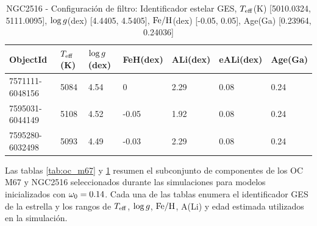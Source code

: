 \begin{table}
	\centering
	\begin{tabular}{l l l l l l l} 
		\hline
		ObjectId & $T_{\mathrm{eff}}$(K) & $\mathrm{log} \, g$(dex) & FeH(dex) & ALi(dex) & eALi(dex) & Age(Ga)\\
		\hline
		7571111-6048156 & 5084 & 4.54 & 0 & 2.29 & 0.08 & 0.24\\ 
		7595031-6044149 & 5108 & 4.52 & -0.05 & 1.92 & 0.08 & 0.24\\ 
		7595280-6032498 & 5093 & 4.49 & -0.03 & 2.29 & 0.08 & 0.24\\ 
		\hline
	\end{tabular}
	\caption{NGC2516 - Configuración de filtro: Identificador estelar GES, $T_{\mathrm{eff}}$(K) [5010.0324, 5111.0095], $\mathrm{log} \, g$(dex) [4.4405, 4.5405], $\mathrm{Fe}/\mathrm{H}$(dex) [-0.05, 0.05], Age(Ga) [0.23964, 0.24036]}
	\label{tab:oc_ngc2516}
\end{table}

Las tablas \ref{tab:oc_m67} y \ref{tab:oc_ngc2516} resumen el subconjunto de componentes de los OC M67 y NGC2516 seleccionados durante las simulaciones para modelos inicializados con $\omega_{\mathrm{0}} = 0.14$. Cada una de las tablas enumera el identificador GES de la estrella y los rangos de $T_{\mathrm{eff}}$, $\mathrm{log} \, g$, $\mathrm{Fe}/\mathrm{H}$, A(Li) y edad estimada utilizados en la simulación.


\newpage
{}
\recalctypearea

